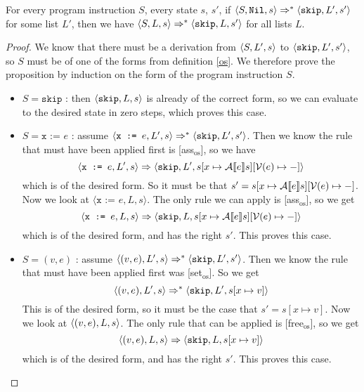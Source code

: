 \begin{proposition}
For every program instruction $S$, every state $s$, $s'$, if $\langle S, \texttt{Nil}, s \rangle \Rightarrow ^{*} \langle \texttt{skip}, L', s' \rangle$ for some list $L'$, then we have $\langle S, L, s \rangle \Rightarrow ^{*} \langle \texttt{skip}, L, s' \rangle$ for all lists $L$. 
\end{proposition}

\begin{proof}
We know that there must be a derivation from $\langle S, L', s \rangle$ to $\langle \texttt{skip}, L', s' \rangle$, so $S$ must be of one of the forms from definition \ref{os}. We therefore prove the proposition by induction on the form of the program instruction $S$.

\begin{itemize}[noitemsep]
    \item $S = \texttt{skip}$ : then $\langle \texttt{skip}, L, s \rangle$ is already of the correct form, so we can evaluate to the desired state in zero steps, which proves this case. 
    
    \item $S = \texttt{x := } e$ : assume $\langle \texttt{x := } e, L', s \rangle \Rightarrow ^{*} \langle \texttt{skip}, L', s' \rangle$. Then we know the rule that must have been applied first is [ass$_{\textrm{os}}$], so we have 
    $$\langle \texttt{x := } e, L', s \rangle \Rightarrow \langle \texttt{skip}, L', s[x \mapsto \mathcal{A} \llbracket e \rrbracket s][\mathcal{V}(e)\mapsto-] \rangle$$
    which is of the desired form. So it must be that $s' = s[x \mapsto \mathcal{A} \llbracket e \rrbracket s][\mathcal{V}(e)\mapsto-]$. Now we look at $\langle \texttt{x := } e, L, s \rangle$. The only rule we can apply is [ass$_{\textrm{os}}$], so we get 
    $$\langle \texttt{x := } e, L, s \rangle \Rightarrow \langle \texttt{skip}, L, s [x \mapsto \mathcal{A} \llbracket e \rrbracket s][\mathcal{V}(e)\mapsto-] \rangle$$
    which is of the desired form, and has the right $s'$. This proves this case. 
    
    \item $S = (v,e)$ : assume $\langle (v,e), L', s \rangle \Rightarrow ^{*} \langle \texttt{skip}, L', s' \rangle$. Then we know the rule that must have been applied first was [set$_{\textrm{os}}$]. So we get
    $$\langle (v,e), L', s \rangle \Rightarrow ^{*} \langle \texttt{skip}, L', s[x\mapsto v] \rangle$$ 
    This is of the desired form, so it must be the case that $s' = s[x\mapsto v]$. Now we look at $\langle (v,e), L, s \rangle$. The only rule that can be applied is [free$_{\textrm{os}}$], so we get $$\langle (v,e), L, s \rangle \Rightarrow  \langle \texttt{skip}, L, s[x\mapsto v] \rangle$$
    which is of the desired form, and has the right $s'$. This proves this case.
    

\end{itemize}
\end{proof}
